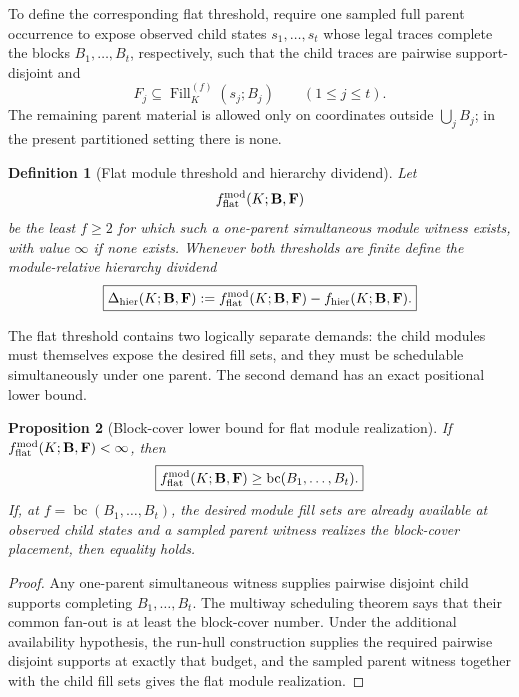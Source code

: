 \documentclass[11pt]{article}
\newtheorem{definition}{Definition}[section]
\newtheorem{proposition}[definition]{Proposition}
\begin{document}
To define the corresponding flat threshold, require one sampled full parent
occurrence to expose observed child states $s_1,\ldots,s_t$ whose legal traces
complete the blocks $B_1,\ldots,B_t$, respectively, such that the child traces
are pairwise support-disjoint and
\[
  F_j\subseteq\operatorname{Fill}^{(f)}_K(s_j;B_j)
  \qquad(1\le j\le t).
\]
The remaining parent material is allowed only on coordinates outside
$\bigcup_jB_j$; in the present partitioned setting there is none.

\begin{definition}[Flat module threshold and hierarchy dividend]
\label{def:module-flat-threshold}
Let
\[
 f_{\rm flat}^{\rm mod}(K;\mathbf B,\mathbf F)
\]
be the least $f\ge2$ for which such a one-parent simultaneous module witness
exists, with value $\infty$ if none exists.  Whenever both thresholds are
finite define the \emph{module-relative hierarchy dividend}
\[
 \boxed{
 \Delta_{\rm hier}(K;\mathbf B,\mathbf F)
 :=f_{\rm flat}^{\rm mod}(K;\mathbf B,\mathbf F)
   -f_{\rm hier}(K;\mathbf B,\mathbf F).
 }
\]
\end{definition}

The flat threshold contains two logically separate demands: the child modules
must themselves expose the desired fill sets, and they must be schedulable
simultaneously under one parent.  The second demand has an exact positional
lower bound.

\begin{proposition}[Block-cover lower bound for flat module realization]
\label{prop:flat-module-bc-lower}
If
$f_{\rm flat}^{\rm mod}(K;\mathbf B,\mathbf F)<\infty$, then
\[
 \boxed{
 f_{\rm flat}^{\rm mod}(K;\mathbf B,\mathbf F)
 \ge \operatorname{bc}(B_1,\ldots,B_t).
 }
\]
If, at $f=\operatorname{bc}(B_1,\ldots,B_t)$, the desired module fill sets are
already available at observed child states and a sampled parent witness
realizes the block-cover placement, then equality holds.
\end{proposition}

\begin{proof}
Any one-parent simultaneous witness supplies pairwise disjoint child supports
completing $B_1,\ldots,B_t$.  The multiway scheduling theorem says that their
common fan-out is at least the block-cover number.  Under the additional
availability hypothesis, the run-hull construction supplies the required
pairwise disjoint supports at exactly that budget, and the sampled parent
witness together with the child fill sets gives the flat module realization.
\end{proof}
\end{document}
